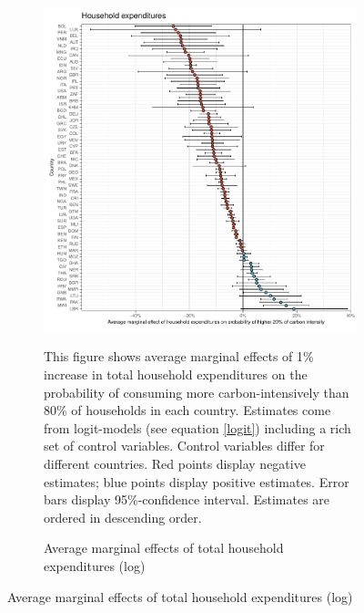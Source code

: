\begin{figure}[ht!]
  \centering
  \caption{Average marginal effects (logit-models)}\label{fig:Logit_ME}
  \begin{subfigure}[b]{\textwidth}
  \centering
  \includegraphics{1_Figures/Analysis_Logit_Models_Marginal_Effects/Average_Marginal_Effects_affected_upper_80_log_hh_expenditures_USD_2014_2017B.pdf}
  \caption{Average marginal effects of total household expenditures (log)} \label{fig:Logit_ME_exp}
  \begin{subcaption2}
     This figure shows average marginal effects of 1\% increase in total household expenditures on the probability of consuming more carbon-intensively than 80\% of households in each country. Estimates come from logit-models (see equation \ref{logit}) including a rich set of control variables. Control variables differ for different countries. Red points display negative estimates; blue points display positive estimates. Error bars display 95\%-confidence interval. Estimates are ordered in descending order.
  \end{subcaption2}
  \end{subfigure}
 \end{figure}
 \clearpage

